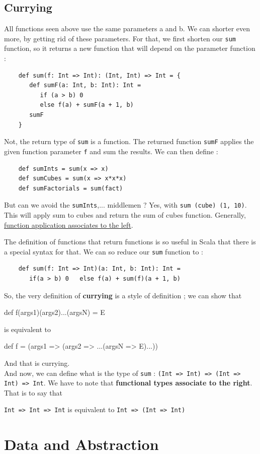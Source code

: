 \documentclass[12pt,a4paper]{article}
\begin{document}
\subsection{Currying}
All functions seen above use the same parameters a and b. We can shorter even more, by getting rid of these parameters. For that, we first shorten our {\tt sum} function, so it returns a new function that will depend on the parameter function :
\begin{verbatim}
	def sum(f: Int => Int): (Int, Int) => Int = {
	   def sumF(a: Int, b: Int): Int =
	      if (a > b) 0
	      else f(a) + sumF(a + 1, b)
	   sumF
	}
\end{verbatim}
Not, the return type of {\tt sum} is a function. The returned function {\tt sumF} applies the given function parameter {\tt f} and sum the results. We can then define :
\begin{verbatim}
	def sumInts = sum(x => x)
	def sumCubes = sum(x => x*x*x)
	def sumFactorials = sum(fact)
\end{verbatim}
But can we avoid the {\tt sumInts},... middlemen ? Yes, with {\tt sum (cube) (1, 10)}. This will apply sum to cubes and return the sum of cubes function. Generally, \uline{function application associates to the left}.

The definition of functions that return functions is so useful in Scala that there is a special syntax for that. We can so reduce our {\tt sum} function to :
\begin{verbatim}
	def sum(f: Int => Int)(a: Int, b: Int): Int =
	   if(a > b) 0   else f(a) + sum(f)(a + 1, b)
\end{verbatim}
So, the very definition of \textbf{currying} is a style of definition ; we can show that 
\begin{code}
	def f(args1)(args2)...(argsN) = E
\end{code}
is equivalent to 
\begin{code}
	def f = (args1 => (args2 => ...(argsN => E)...))
\end{code}
And that is currying.\\
 And now, we can define what is the type of {\tt sum} : {\tt (Int => Int) => (Int => Int) => Int}. We have to note that \textbf{functional types associate to the right}. That is to say that
\begin{center}
	{\tt Int => Int => Int} is equivalent to {\tt Int => (Int => Int)}
\end{center}
\section{Data and Abstraction}
\end{document}
